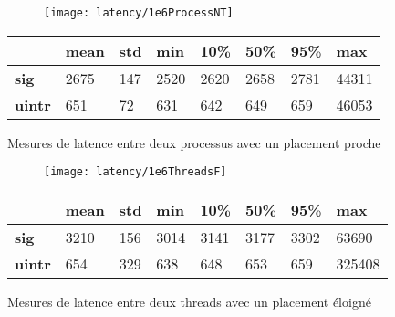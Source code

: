 \begin{figure}[H]
  \begin{subfigure}{\textwidth}
    \texttt{[image: latency/1e6ProcessNT]}
    \caption{}
    \label{subfig:latency1e6ProcessNT}
  \end{subfigure}
  \begin{subtable}{\textwidth}
    \centering
    \begin{tabular}{| l | l | l | l | l | l | l | l |}
      \hline
      &\bf mean &\bf std &\bf min  &\bf 10\% &\bf 50\% &\bf 95\% &\bf max\\
      \hline
      \bf sig   & 2675 & 147 & 2520 & 2620 & 2658 & 2781 & 44311\\
      \hline
      \bf uintr & 651  & 72  & 631  & 642  & 649  & 659  & 46053\\
      \hline
    \end{tabular}
    \caption{}
    \label{tab:latency1e6ProcessNT}
  \end{subtable}
  \caption{Mesures de latence entre deux processus avec un placement proche}
  \label{fig:latency1e6ProcessNT}
\end{figure}

\begin{figure}[H]
  \begin{subfigure}{\textwidth}
    \texttt{[image: latency/1e6ThreadsF]}
    \caption{}
    \label{subfig:latency1e6ThreadsF}
  \end{subfigure}
  \begin{subtable}{\textwidth}
    \centering
    \begin{tabular}{| l | l | l | l | l | l | l | l |}
      \hline
      &\bf mean &\bf std &\bf min  &\bf 10\% &\bf 50\% &\bf 95\% &\bf max\\
      \hline
      \bf sig   & 3210 & 156 & 3014 & 3141 & 3177 & 3302 & 63690\\
      \hline
      \bf uintr & 654  & 329 & 638  & 648  & 653  & 659  & 325408\\
      \hline
    \end{tabular}
    \caption{}
    \label{tab:latency1e6ThreadsF}
  \end{subtable}
  \caption{Mesures de latence entre deux threads avec un placement éloigné}
  \label{fig:latency1e6ThreadsF}
\end{figure}

